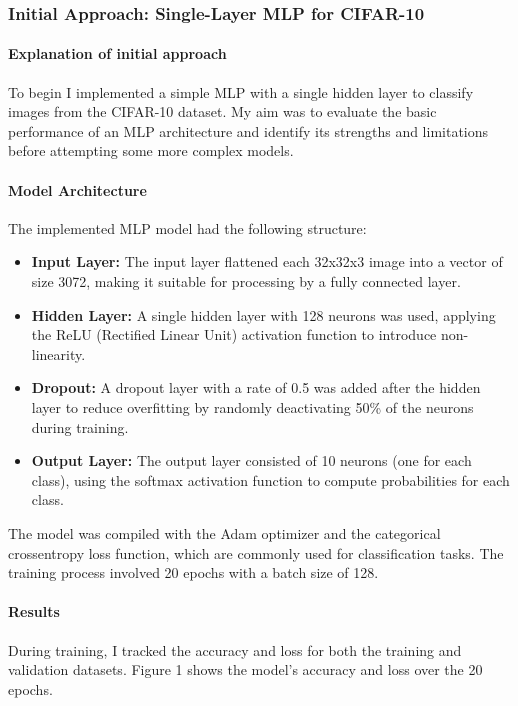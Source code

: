 \documentclass[lettersize,journal]{IEEEtran}
\begin{document}
\subsubsection{\textbf{Initial Approach: Single-Layer MLP for CIFAR-10}}
\paragraph{\textbf{Explanation of initial approach}}
To begin I implemented a simple MLP with a single hidden layer to classify images from the CIFAR-10 dataset. My aim was to evaluate the basic performance of an MLP architecture and identify its strengths and limitations before attempting some more complex models.

\paragraph{\textbf{Model Architecture}}

The implemented MLP model had the following structure:
\begin{itemize}
    \item \textbf{Input Layer:} The input layer flattened each 32x32x3 image into a vector of size 3072, making it suitable for processing by a fully connected layer.
    \item \textbf{Hidden Layer:} A single hidden layer with 128 neurons was used, applying the ReLU (Rectified Linear Unit) activation function to introduce non-linearity.
    \item \textbf{Dropout:} A dropout layer with a rate of 0.5 was added after the hidden layer to reduce overfitting by randomly deactivating 50\% of the neurons during training.
    \item \textbf{Output Layer:} The output layer consisted of 10 neurons (one for each class), using the softmax activation function to compute probabilities for each class.
\end{itemize}

The model was compiled with the Adam optimizer and the categorical crossentropy loss function, which are commonly used for classification tasks. The training process involved 20 epochs with a batch size of 128.

\paragraph{\textbf{Results}}
During training, I tracked the accuracy and loss for both the training and validation datasets. Figure 1 shows the model's accuracy and loss over the 20 epochs.
\end{document}
